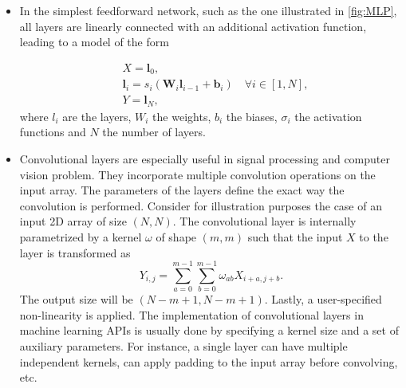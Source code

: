 \begin{itemize}
    \item In the simplest feedforward network, such as the one illustrated in \cref{fig:MLP}, all layers are linearly connected with an additional activation function, leading to a model of the form

    \begin{equation}
        \begin{aligned}
            &X=\boldsymbol{l}_{0}, \\
            &\boldsymbol{l}_{i}=s_{i}(\boldsymbol{W}_{i}\boldsymbol{l}_{i-1}+\boldsymbol{b}_{i})\quad\forall i\in[1,N], \\
            &Y=\boldsymbol{l}_{N},
        \end{aligned}
    \end{equation}
    where $l_i$ are the layers, $W_i$ the weights, $b_i$ the biases, $\sigma_i$ the activation functions and $N$ the number of layers.
    
    
    \item Convolutional layers are especially useful in signal processing and computer vision problem. They incorporate multiple convolution operations on the input array. The parameters of the layers define the exact way the convolution is performed. Consider for illustration purposes the case of an input 2D array of size $(N,N)$. The convolutional layer is internally parametrized by a kernel $\omega$ of shape $(m,m)$ such that the input $X$ to the layer is transformed as
    \begin{equation}
        Y_{i,j}=\sum_{a=0}^{m-1} \sum_{b=0}^{m-1} \omega_{ab} X_{i+a,j+b}.
    \end{equation}
    The output size will be $(N-m+1,N-m+1)$. Lastly, a user-specified non-linearity is applied. The implementation of convolutional layers in machine learning APIs is usually done by specifying a kernel size and a set of auxiliary parameters. For instance, a single layer can have multiple independent kernels, can apply padding to the input array before convolving, etc.


\end{itemize}
